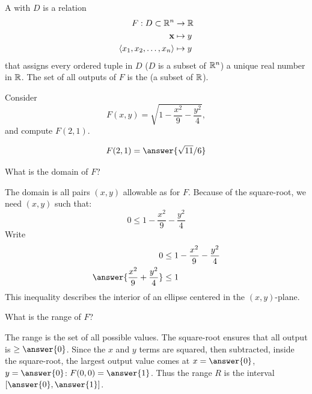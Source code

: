 \documentclass{ximera}
\begin{document}
\begin{definition}
  A  with  $D$ is a
  relation
  \begin{align*}
    F: D\subset \mathbb R^n  &\to \mathbb R\\
    \mathbf{x} &\mapsto y\\
    \left\langle x_1,x_2,\dots,x_n\right\rangle &\mapsto y
  \end{align*}
  that assigns every ordered tuple in $D$ ($D$ is a subset of $\mathbb R^n$)
  a unique real number in $\mathbb R$. The set of all outputs of $F$ is the
   (a subset of $\mathbb R$).
\end{definition}

\begin{question}
  Consider
  \[
  F(x,y) = \sqrt{1-\frac{x^2}{9}-\frac{y^2}{4}},
  \]
  and compute $F(2,1)$.
  \begin{prompt}
    \[
    F(2,1) = \answer{\sqrt{11}/6}
    \]
  \end{prompt}
  \begin{question}
    What is the domain of $F$?
    \begin{prompt}
      The domain is all pairs $(x,y)$ allowable as
       for $F$.
      Because of the square-root, we need $(x,y)$ such that:
      \[
      0 \le 1-\frac{x^2}{9}-\frac{y^2}{4}
      \]
      Write
      \begin{align*}
        0&\le 1-\frac{x^2}{9}-\frac{y^2}{4}\\
        \answer{\frac{x^2}{9}+\frac{y^2}{4}}&\le 1
      \end{align*}
      This inequality describes the interior of an ellipse centered in
      the $(x,y)$-plane.
    \end{prompt}
  \end{question}
  \begin{question}
    What is the range of $F$?
    \begin{prompt}
      The range is the set of all possible
       values. The
      square-root ensures that all output is $\geq \answer{0}$. Since
      the $x$ and $y$ terms are squared, then subtracted, inside the
      square-root, the largest output value comes at $x=\answer{0}$,
      $y=\answer{0}$: $F(0,0) = \answer{1}$. Thus the range $R$ is the
      interval $[\answer{0},\answer{1}]$.
    \end{prompt}
  \end{question}
\end{question}
\end{document}
